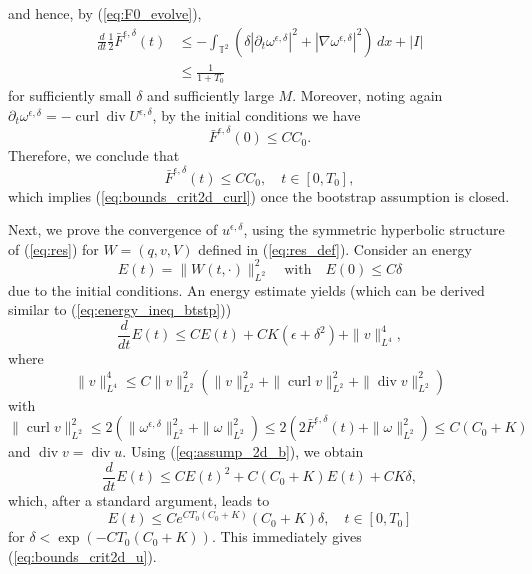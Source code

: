 \documentclass[reqno,10pt]{amsart}
\theoremstyle{definition}
\theoremstyle{remark}
\numberwithin{equation}{section}
\DeclareMathOperator{\dive}{div}
\DeclareMathOperator{\curl}{curl}
\begin{document}
and hence, by (\ref{eq:F0_evolve}), 
\[
\begin{aligned}
    \frac{d}{dt}\frac{1}{2} \bar F^{\epsilon,\delta}(t) &\le -\int_{\mathbb T^2} \left( \delta \left|\partial_t \omega^{\epsilon,\delta} \right|^2 + \left| \nabla\omega^{\epsilon,\delta} \right|^2 \right) \, dx +|I| \\
    &\le \frac{1}{1+T_0}
\end{aligned}
\]
for sufficiently small $\delta$ and sufficiently large $M$. Moreover, noting again $\partial_t \omega^{\epsilon,\delta}=-\curl \dive U^{\epsilon,\delta}$, by the initial conditions we have
\[
    \bar F^{\epsilon,\delta}(0)\le CC_0.
\]
Therefore, we conclude that
\begin{equation} \label{eq:F0_2d}
    \bar F^{\epsilon,\delta}(t) \le CC_0, \quad t\in[0,T_0],
\end{equation}
which implies (\ref{eq:bounds_crit2d_curl}) once the bootstrap assumption is closed.

Next, we prove the convergence of $u^{\epsilon,\delta}$, using the symmetric hyperbolic structure of (\ref{eq:res}) for $W=(q,v,V)$ defined in (\ref{eq:res_def}). Consider an energy
\[
    E(t) = \|W(t,\cdot)\|_{L^2}^2 \quad \text{with} \quad E(0)\le C\delta
\]
due to the initial conditions. An energy estimate yields (which can be derived similar to (\ref{eq:energy_ineq_btstp}))
\[
    \frac{d}{dt}E(t) \le CE(t) + CK(\epsilon+\delta^2) + \|v\|_{L^4}^4,
\]
where
\[
    \|v\|_{L^4}^4 \le C \|v\|_{L^2}^2 \left( \|v\|_{L^2}^2 + \|\curl v\|_{L^2}^2 + \|\dive v\|_{L^2}^2 \right)
\]
with
\[
    \| \curl v\|_{L^2}^2 \le 2 \left( \|\omega^{\epsilon,\delta}\|_{L^2}^2 + \|\omega\|_{L^2}^2 \right)
    \le 2 \left( 2\bar F^{\epsilon,\delta}(t) + \|\omega\|_{L^2}^2 \right) \le C(C_0+K)
\]
and $\dive v = \dive u$. Using (\ref{eq:assump_2d_b}), we obtain
\[
    \frac{d}{dt}E(t) \le CE(t)^2 + C(C_0+K)E(t) + CK\delta,
\]
which, after a standard argument, leads to
\[
    E(t) \le C e^{CT_0(C_0+K)}(C_0+K)\delta, \quad t\in[0,T_0]
\]
for $\delta< \exp(-CT_0(C_0 + K))$. This immediately gives (\ref{eq:bounds_crit2d_u}).
\end{document}
